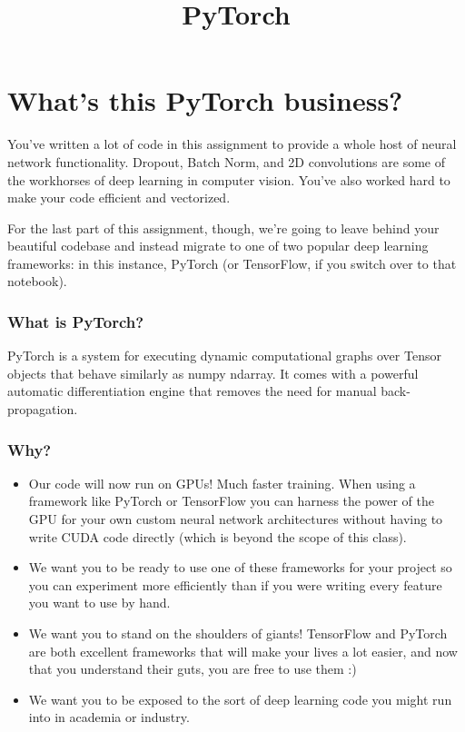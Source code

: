 \documentclass[11pt]{article}
\title{PyTorch}
\providecommand{\tightlist}{%
      \setlength{\itemsep}{0pt}\setlength{\parskip}{0pt}}
\begin{document}
    
    
    \maketitle
    
    

    
    \section{What's this PyTorch
business?}\label{whats-this-pytorch-business}

You've written a lot of code in this assignment to provide a whole host
of neural network functionality. Dropout, Batch Norm, and 2D
convolutions are some of the workhorses of deep learning in computer
vision. You've also worked hard to make your code efficient and
vectorized.

For the last part of this assignment, though, we're going to leave
behind your beautiful codebase and instead migrate to one of two popular
deep learning frameworks: in this instance, PyTorch (or TensorFlow, if
you switch over to that notebook).

\subsubsection{What is PyTorch?}\label{what-is-pytorch}

PyTorch is a system for executing dynamic computational graphs over
Tensor objects that behave similarly as numpy ndarray. It comes with a
powerful automatic differentiation engine that removes the need for
manual back-propagation.

\subsubsection{Why?}\label{why}

\begin{itemize}
\tightlist
\item
  Our code will now run on GPUs! Much faster training. When using a
  framework like PyTorch or TensorFlow you can harness the power of the
  GPU for your own custom neural network architectures without having to
  write CUDA code directly (which is beyond the scope of this class).
\item
  We want you to be ready to use one of these frameworks for your
  project so you can experiment more efficiently than if you were
  writing every feature you want to use by hand.
\item
  We want you to stand on the shoulders of giants! TensorFlow and
  PyTorch are both excellent frameworks that will make your lives a lot
  easier, and now that you understand their guts, you are free to use
  them :)
\item
  We want you to be exposed to the sort of deep learning code you might
  run into in academia or industry.
\end{itemize}
\end{document}
